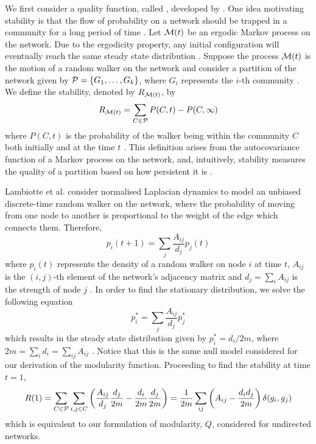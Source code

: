 We first consider a quality function, called , developed by \cite{LDB08}.
One idea motivating stability is that the flow of probability on a network should be trapped in a community for a long period of time \cite{Lam10}.
Let $\mathcal M(t)$ be an ergodic Markov process on the network.
Due to the ergodicity property, any initial configuration will eventually reach the same steady state distribution \cite{LDB08}.
Suppose the process $\mathcal M(t)$ is the motion of a random walker on the network and consider a partition of the network given by $\mathcal P = \{ G_{1},\dots,G_{k} \}$, where $G_{i}$ represents the $i$-th community \cite{LDB08}.
We define the stability, denoted by $R_{\mathcal M(t)}$, by
\begin{equation}
	\label{eq:stability}
	R_{\mathcal M(t)} = \sum_{C \in \mathcal P} P(C,t) - P(C,\infty)
\end{equation}
where $P(C,t)$ is the probability of the walker being within the community $C$ both initially and at the time $t$ \cite{LDB08}.
This definition arises from the autocovariance function of a Markov process on the network, and, intuitively, stability measures the quality of a partition based on how persistent it is \cite{DYB08}.

Lambiotte et al. \cite{LDB08} consider normalised Laplacian dynamics to model an unbiased discrete-time random walker on the network, where the probability of moving from one node to another is proportional to the weight of the edge which connects them.
Therefore,
\begin{equation}
	\label{eq:densityRandomWalker}
	p_{i}(t+1) = \sum_{j} \frac{A_{ij}}{d_{j}} p_{j}(t)
\end{equation}
where $p_{i}(t)$ represents the density of a random walker on node $i$ at time $t$, $A_{ij}$ is the $(i,j)$-th element of the network's adjacency matrix and $d_{j} = \sum_{i} A_{ij}$ is the strength of node $j$ \cite{LDB08}.
In order to find the stationary distribution, we solve the following equation
\begin{equation}
	\label{eq:solveDensityRandomWalkerStationaryDistribution}
	p_{i}^{*} = \sum_{j} \frac{A_{ij}}{d_{j}} p_{j}^{*}
\end{equation}
which results in the steady state distribution given by $p_{i}^{*} = d_{i}/2m$, where $2m = \sum_{i} d_{i} = \sum_{ij} A_{ij}$ \cite{LDB08}.
Notice that this is the same null model considered for our derivation of the modularity function.
Proceeding to find the stability at time $t=1$,
\begin{equation}
	\label{eq:stabilityAtTime1}
	R(1) = \sum_{C \in \mathcal P} \sum_{i,j \in C} \left( \frac{A_{ij}}{d_{j}} \frac{d_{j}}{2m} - \frac{d_{i}}{2m} \frac{d_{j}}{2m} \right) = \frac{1}{2m} \sum_{ij} \left( A_{ij} - \frac{d_{i}d_{j}}{2m} \right) \delta(g_{i},g_{j})
\end{equation}
which is equivalent to our formulation of modularity, $Q$, considered for undirected networks.

